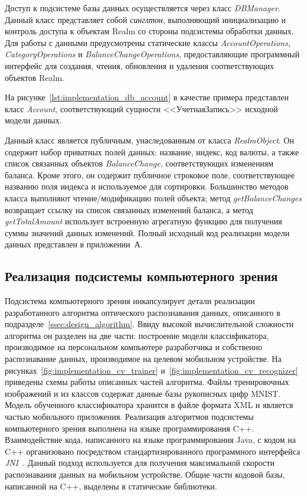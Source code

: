 Доступ к подсистеме базы данных осуществляется через класс
\textit{DBManager}. Данный класс представляет собой \textit{синглтон},
выполняющий инициализацию и контроль доступа к объектам Realm
со стороны подсистемы обработки данных.
Для работы с данными предусмотрены статические классы
\textit{AccountOperations}, \textit{CategoryOperations}
и \textit{BalanceChangeOperations}, предоставляющие
программный интерфейс для создания, чтения, обновления и
удаления соответствующих объектов Realm.

На рисунке~\ref{lst:implementation_db_account} в качестве примера
представлен класс \textit{Account}, соответствующий сущности <<УчетнаяЗапись>>
исходной модели данных.



Данный класс является публичным, унаследованным от класса \textit{RealmObject}.
Он содержит набор приватных полей данных: название, индекс, код валюты,
а также список связанных объектов \textit{BalanceChange},
соответствующих изменениям баланса.
Кроме этого, он содержит публичное строковое поле, соответствующее
названию поля индекса и используемое для сортировки.
Большинство методов класса выполняют чтение/модификацию
полей объекта; метод \textit{getBalanceChanges} возвращает ссылку на
список связанных изменений баланса,
а метод \textit{getTotalAmount} использует встроенную
агрегатную функцию для получения суммы значений данных изменений.
Полный исходный код реализации модели данных представлен в приложении~А.

\subsection{Реализация подсистемы компьютерного зрения}
\label{subsec:implementation_cv}

Подсистема компьютерного зрения инкапсулирует детали реализации
разработанного алгоритма оптического распознавания данных,
описанного в подразделе~\ref{ssec:design_algorithm}.
Ввиду высокой вычислительной сложности алгоритма
он разделен на две части:
построение модели классификатора,
производимое на персональном компьютере разработчика и
собственно распознавание данных,
производимое на целевом мобильном устройстве.
На рисунках~\ref{fig:implementation_cv_trainer}
и~\ref{fig:implementation_cv_recognizer} приведены схемы работы
описанных частей алгоритма.
Файлы тренировочных изображений и из классов содержат
данные базы рукописных цифр MNIST.
Модель обученного классификатора хранится в файле формата XML
и является частью мобильного приложения.
Реализация алгоритмов подсистемы компьютерного зрения
выполнена на языке программирования C++.
Взаимодействие кода, написанного на языке программирования Java,
с кодом на C++ организовано посредством стандартизированного
программного интерфейса \textit{JNI}~\cite{spec_jni}.
Данный подход используется для получения максимальной скорости
распознавания данных на мобильном устройстве.
Общие части кодовой базы, написанной на C++, выделены в статические библиотеки.

